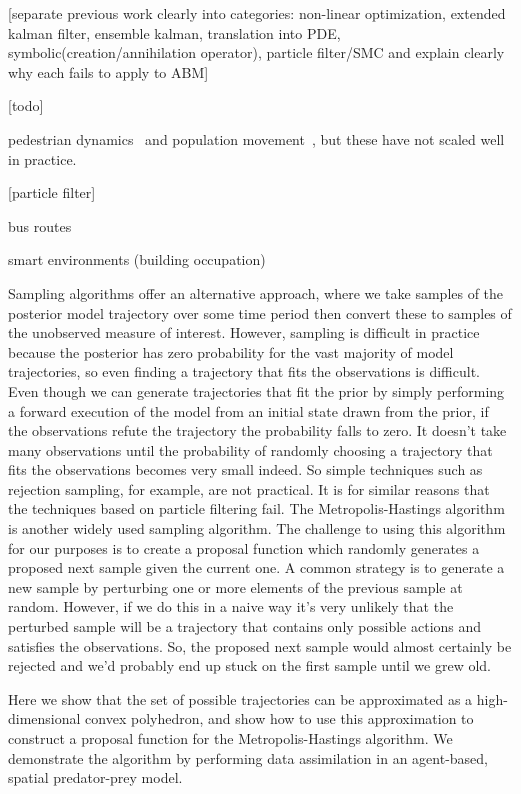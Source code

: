 \documentclass{article}
\begin{document}
[separate previous work clearly into categories: non-linear optimization, extended kalman filter, ensemble kalman, translation into PDE, symbolic(creation/annihilation operator), particle filter/SMC and explain clearly why each fails to apply to ABM]

[todo]

pedestrian dynamics~\cite{ward_dynamic_2016, clay_realtime_2020, malleson_simulating_2020} and population movement~\cite{lueck_who_2019}, but these have not scaled well in practice.

[particle filter]

bus routes~\cite{kieu_dealing_2020}

smart environments (building occupation) \cite{wang_data_2015}

Sampling algorithms offer an alternative approach, where we take samples of the posterior model trajectory over some time period then convert these to samples of the unobserved measure of interest. However, sampling is difficult in practice because the posterior has zero probability for the vast majority of model trajectories, so even finding a trajectory that fits the observations is difficult. Even though we can generate trajectories that fit the prior by simply performing a forward execution of the model from an initial state drawn from the prior, if the observations refute the trajectory the probability falls to zero. It doesn't take many observations until the probability of randomly choosing a trajectory that fits the observations becomes very small indeed. So simple techniques such as rejection sampling, for example, are not practical.  It is for similar reasons that the techniques based on particle filtering fail. The Metropolis-Hastings algorithm is another widely used sampling algorithm. The challenge to using this algorithm for our purposes is to create a proposal function which randomly generates a proposed next sample given the current one. A common strategy is to generate a new sample by perturbing one or more elements of the previous sample at random. However, if we do this in a naive way it's very unlikely that the perturbed sample will be a trajectory that contains only possible actions and satisfies the observations. So, the proposed next sample would almost certainly be rejected and we'd probably end up stuck on the first sample until we grew old. 

Here we show that the set of possible trajectories can be approximated as a high-dimensional convex polyhedron, and show how to use this approximation to construct a proposal function for the Metropolis-Hastings algorithm. We demonstrate the algorithm by performing data assimilation in an agent-based, spatial predator-prey model.
\end{document}
